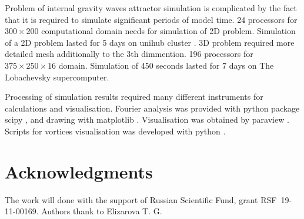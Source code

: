 \documentclass[a4wide,fontsize=12pt]{article}
\begin{document}
Problem of internal gravity waves attractor simulation is complicated by the fact that it is required to simulate significant periods of model time. 24 processors for $300 \times 200$ computational domain needs for simulation of 2D problem. Simulation of a 2D problem lasted for 5 days on unihub cluster \cite{Unihub2014}. 3D problem required more detailed mesh additionally to the 3th dimmention. 196 processors for $375 \times 250 \times 16$ domain. Simulation of 450 seconds lasted for 7 days on The Lobachevsky supercomputer.

Processing of simulation results required many different instruments for calculations and visualisation.
Fourier analysis was provided with python package scipy \cite{scipy}, and drawing with matplotlib \cite{matplotlib}. Visualisation was obtained by paraview \cite{paraview}. Scripts for vortices visualisation was developed with python \cite{python}. 

\section{Acknowledgments}

The work will done with the support of Russian Scientific Fund, grant RSF~19-11-00169.
Authors thank to Elizarova T. G.



\end{document}
